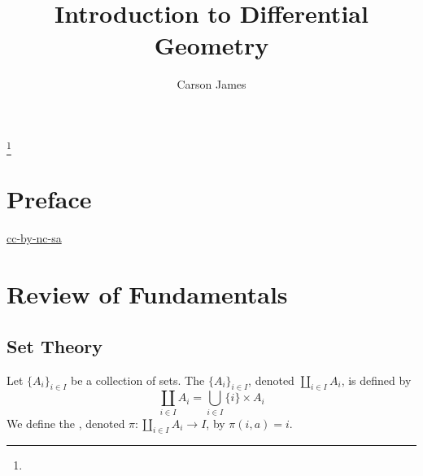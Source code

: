 \documentclass{book}
\begin{document}
	
	\frontmatter
	
	\title{Introduction to Differential Geometry}
	
	
	\author{Carson James}
	\thanks{}
	
	\date{}
	
	\maketitle
	
	
\setcounter{page}{4}
	
\tableofcontents
\printunsrtglossary[type=symbols,style=long,title={Notation}]
	
%
	
\mainmatter
%
	
\chapter*{Preface}
	
\begin{flushleft}
	\href{https://creativecommons.org/licenses/by-nc-sa/4.0/legalcode.txt}{cc-by-nc-sa}
\end{flushleft}
	
\newpage
	
	\chapter{Review of Fundamentals}

	\section{Set Theory}
	
	\begin{defn}
		Let $\{A_i\}_{i \in I}$ be a collection of sets. The  $\{A_i\}_{i \in I}$, denoted $\coprod\limits_{i \in I} A_i$, is defined by $$\coprod_{i \in I}A_i = \bigcup_{i\in I} \{i\} \times A_i$$ 
		We define the , denoted $\pi: \coprod\limits_{i \in I} A_i \rightarrow I$, by $\pi(i, a) = i$.
	\end{defn}
\end{document}

